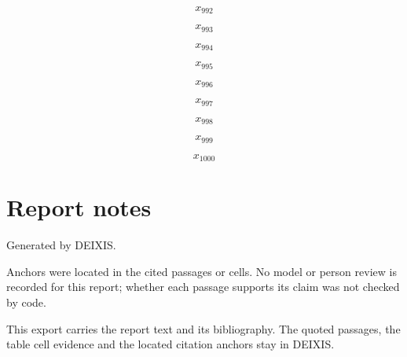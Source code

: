 \documentclass[journal]{IEEEtran}
\begin{document}
\begin{equation}
\label{eq:EQ992}
x_{992}
\end{equation}
\cite{Synth26}

\begin{equation}
\label{eq:EQ993}
x_{993}
\end{equation}
\cite{Synth26}

\begin{equation}
\label{eq:EQ994}
x_{994}
\end{equation}
\cite{Synth26}

\begin{equation}
\label{eq:EQ995}
x_{995}
\end{equation}
\cite{Synth26}

\begin{equation}
\label{eq:EQ996}
x_{996}
\end{equation}
\cite{Synth26}

\begin{equation}
\label{eq:EQ997}
x_{997}
\end{equation}
\cite{Synth26}

\begin{equation}
\label{eq:EQ998}
x_{998}
\end{equation}
\cite{Synth26}

\begin{equation}
\label{eq:EQ999}
x_{999}
\end{equation}
\cite{Synth26}

\begin{equation*}
x_{1000}
\end{equation*}
\cite{Synth26}

\section*{Report notes}

Generated by DEIXIS.

Anchors were located in the cited passages or cells. No model or person review is recorded for this report; whether each passage supports its claim was not checked by code.

This export carries the report text and its bibliography. The quoted passages, the table cell evidence and the located citation anchors stay in DEIXIS.




\end{document}
